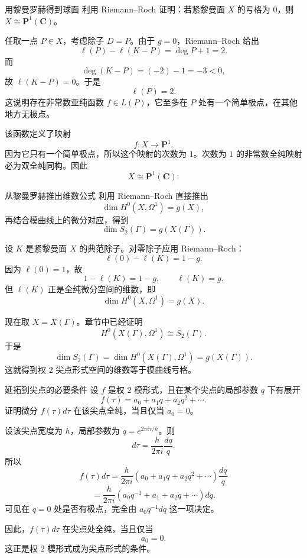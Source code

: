\begin{problem}{用黎曼罗赫得到球面}
\hard
利用 Riemann--Roch 证明：若紧黎曼面 $X$ 的亏格为 $0$，则 $X\cong \mathbf P^1(\mathbf C)$。
\end{problem}
\begin{solution}
任取一点 $P\in X$，考虑除子 $D=P$。由于 $g=0$，Riemann--Roch 给出
\[
\ell(P)-\ell(K-P)=\deg P+1=2.
\]
而
\[
\deg(K-P)=(-2)-1=-3<0,
\]
故 $\ell(K-P)=0$。于是
\[
\ell(P)=2.
\]
这说明存在非常数亚纯函数 $f\in L(P)$，它至多在 $P$ 处有一个简单极点，在其他地方无极点。

该函数定义了映射
\[
f:X\to \mathbf P^1.
\]
因为它只有一个简单极点，所以这个映射的次数为 $1$。次数为 $1$ 的非常数全纯映射必为双全纯同构。因此
\[
X\cong \mathbf P^1(\mathbf C).
\]
\end{solution}

\begin{problem}{从黎曼罗赫推出维数公式}
\hard
利用 Riemann--Roch 直接推出
\[
\dim H^0(X,\Omega^1)=g(X),
\]
再结合模曲线上的微分对应，得到
\[
\dim S_2(\Gamma)=g(X(\Gamma)).
\]
\end{problem}
\begin{solution}
设 $K$ 是紧黎曼面 $X$ 的典范除子。对零除子应用 Riemann--Roch：
\[
\ell(0)-\ell(K)=1-g.
\]
因为 $\ell(0)=1$，故
\[
1-\ell(K)=1-g,
\qquad \ell(K)=g.
\]
但 $\ell(K)$ 正是全纯微分空间的维数，即
\[
\dim H^0(X,\Omega^1)=g(X).
\]

现在取 $X=X(\Gamma)$。章节中已经证明
\[
H^0(X(\Gamma),\Omega^1)\cong S_2(\Gamma).
\]
于是
\[
\dim S_2(\Gamma)=\dim H^0(X(\Gamma),\Omega^1)=g(X(\Gamma)).
\]
这就得到权 $2$ 尖点形式空间的维数等于模曲线亏格。
\end{solution}

\begin{problem}{延拓到尖点的必要条件}
\hard
设 $f$ 是权 $2$ 模形式，且在某个尖点的局部参数 $q$ 下有展开
\[
f(\tau)=a_0+a_1q+a_2q^2+\cdots.
\]
证明微分 $f(\tau)d\tau$ 在该尖点全纯，当且仅当 $a_0=0$。
\end{problem}
\begin{solution}
设该尖点宽度为 $h$，局部参数为 $q=e^{2\pi i\tau/h}$。则
\[
d\tau=\frac{h}{2\pi i}\frac{dq}{q}.
\]
所以
\[
f(\tau)d\tau=\frac{h}{2\pi i}\left(a_0+a_1q+a_2q^2+\cdots\right)\frac{dq}{q}
\]
\[
=\frac{h}{2\pi i}\left(a_0q^{-1}+a_1+a_2q+\cdots\right)dq.
\]
可见在 $q=0$ 处是否有极点，完全由 $a_0q^{-1}dq$ 这一项决定。

因此，$f(\tau)d\tau$ 在尖点处全纯，当且仅当
\[
a_0=0.
\]
这正是权 $2$ 模形式成为尖点形式的条件。
\end{solution}

